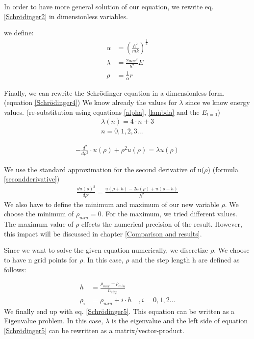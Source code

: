 \documentclass[10pt,a4paper]{article}
\begin{document}
In order to have more general solution of our equation, we rewrite eq. \eqref{Schrödinger2} in dimensionless variables. 

we define:
\begin{align}
	\alpha&= \left(\frac{\hbar^2}{mk}\right)^{\frac{1}{4}} \\ \label{alpha}
	\lambda&=\frac{2m\alpha^2}{\hbar^2}E \\ \label{lambda}
	\rho&= \frac{1}{\alpha} r
\end{align}

Finally, we can rewrite the Schrödinger equation in a dimensionless form. (equation \ref{Schrödinger4}) We know already the values for $\lambda$ since we know energy values. (re-substitution using equations \ref{alpha}, \ref{lambda} and the $E_{l=0}$)
\begin{align}
	\lambda(n)= 4 \cdot n +3 \\
	n=0,1,2,3...
\end{align}

\begin{align}
	-\frac{d^2}{d \rho^2} \cdot u(\rho) + \rho^2 u( \rho ) = \lambda u(\rho) \label{Schrödinger4}
\end{align}

We use the standard approximation for the second derivative of u($\rho$) (formula \ref{secondderivative})
\begin{align}
	\frac{du(\rho)^2}{d \rho^2}= \frac{u(\rho+h)-2u(\rho)+u(\rho-h)}{h^2} \label{secondderivative}
\end{align}
We also have to define the minimum and maximum of our new variable $\rho$. We choose the minimum of $\rho_{min}=0$. For the maximum, we tried different values. The maximum value of $\rho$ effects the numerical precision of the result. However, this impact will be discussed in chapter \ref{Comparison and results}.

Since we want to solve the given equation numerically, we discretize $\rho$. We choose to have n grid points for $\rho$. In this case, $\rho$ and the step length h are defined as follows:

\begin{align}
	h &=\frac{\rho_{max}-\rho_{min}}{n_{step}}\\
	\rho_i &= \rho_{min}+i \cdot h \quad, i=0,1,2...
\end{align}
We finally end up with eq. \eqref{Schrödinger5}. This equation can be written as a Eigenvalue problem. In this case, $\lambda$ is the eigenvalue and the left side of equation \ref{Schrödinger5} can be rewritten as a matrix/vector-product.
\end{document}
